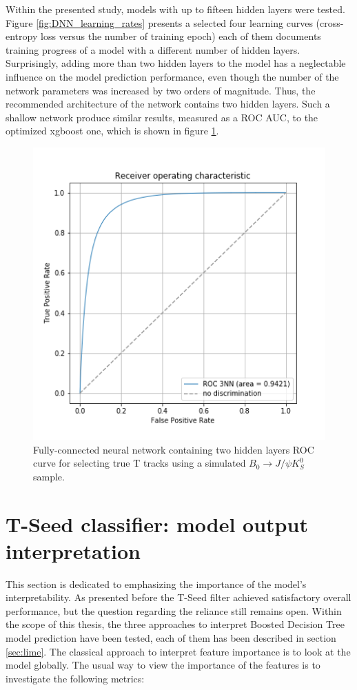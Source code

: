 Within the presented study, models with up to fifteen hidden layers were tested. Figure \ref{fig:DNN_learning_rates} presents a selected four learning curves (cross-entropy loss versus the number of training epoch) each of them documents training progress of a model with a different number of hidden layers. Surprisingly, adding more than two hidden layers to the model has a neglectable influence on the model prediction performance, even though the number of the network parameters was increased by two orders of magnitude.  Thus, the recommended architecture of the network contains two hidden layers. Such a shallow network 
produce similar results, measured as a ROC AUC, to the optimized xgboost one, which is shown in figure \ref{fig:DNN_roc}.

\begin{figure}[!ht]
\centering
\includegraphics[scale=0.7]{figures/NN/roc_3nn.png}
\caption{ Fully-connected neural network containing two hidden layers ROC curve for selecting true T tracks using a simulated  $B_0\rightarrow J/\psi K_S^0 $ sample.      
\label{fig:DNN_roc}}
\end{figure}


\section{T-Seed classifier: model output interpretation}
\label{sec:interpretability}
This section is dedicated to emphasizing the importance of the model's interpretability. As presented before the T-Seed filter achieved satisfactory overall performance, but the question regarding the reliance still remains open.
Within the scope of this thesis, the three approaches to interpret Boosted Decision Tree model prediction have been tested, each of them has been described in section \ref{sec:lime}. 
The classical approach to interpret feature importance is to look at the model globally. The usual way to view the importance of the features is to investigate the following metrics: 

